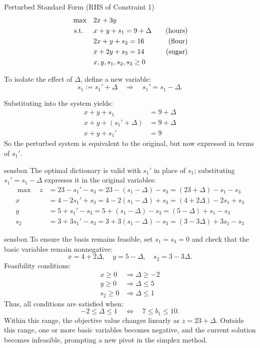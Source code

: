 \begin{sensdisplay}{Perturbed Standard Form (RHS of Constraint 1)}
\[
\begin{aligned}
\max \quad & 2x + 3y \\
\text{ s.t. } \quad
& x + y + s_1 = 9 + \Delta \quad & \text{(hours)} \\
& 2x + y + s_2 = 16 \quad & \text{(flour)} \\
& x + 2y + s_3 = 14 \quad & \text{(sugar)} \\
& x, y, s_1, s_2, s_3 \geq 0
\end{aligned}
\]

To isolate the effect of \( \Delta \), define a new variable:
\[
s_1 := s_1' + \Delta \quad \Rightarrow \quad s_1' = s_1 - \Delta.
\]

Substituting into the system yields:
\[
\begin{aligned}
x + y + s_1 &= 9 + \Delta \\
x + y + (s_1' + \Delta) &= 9 + \Delta \\
x + y + s_1' &= 9
\end{aligned}
\]
So the perturbed system is equivalent to the original, but now expressed in terms of \( s_1' \).
\end{sensdisplay}

\begin{steppanel}{sensbox}
The optimal dictionary is valid with \( s_1' \) in place of \( s_1 \); substituting \( s_1' = s_1 - \Delta \) expresses it in the original variables:
\[
\begin{aligned}
\max \quad
z &= 23 - s_1' - s_3 = 23 - (s_1 - \Delta) - s_3 = (23 + \Delta) - s_1 - s_3 \\
x &= 4 - 2s_1' + s_3 = 4 - 2(s_1 - \Delta) + s_3 = (4 + 2\Delta) - 2s_1 + s_3 \\
y &= 5 + s_1' - s_3 = 5 + (s_1 - \Delta) - s_3 = (5 - \Delta) + s_1 - s_3 \\
s_2 &= 3 + 3s_1' - s_3 = 3 + 3(s_1 - \Delta) - s_3 = (3 - 3\Delta) + 3s_1 - s_3
\end{aligned}
\]
\end{steppanel}

\begin{steppanel}{sensbox}
To ensure the basis remains feasible, set \( s_1 = s_3 = 0 \) and check that the basic variables remain nonnegative:
\[
x = 4 + 2\Delta, \quad
y = 5 - \Delta, \quad
s_2 = 3 - 3\Delta.
\]
Feasibility conditions:
\[
\begin{aligned}
x \geq 0 &\Rightarrow \Delta \geq -2 \\
y \geq 0 &\Rightarrow \Delta \leq 5 \\
s_2 \geq 0 &\Rightarrow \Delta \leq 1
\end{aligned}
\]
Thus, all conditions are satisfied when:
\[
\boxed{-2 \leq \Delta \leq 1}
\quad\Longleftrightarrow\quad
7 \leq b_1 \leq 10.
\]
Within this range, the objective value changes linearly as \( z = 23 + \Delta \). Outside this range, one or more basic variables becomes negative, and the current solution becomes infeasible, prompting a new pivot in the simplex method.
\end{steppanel}

